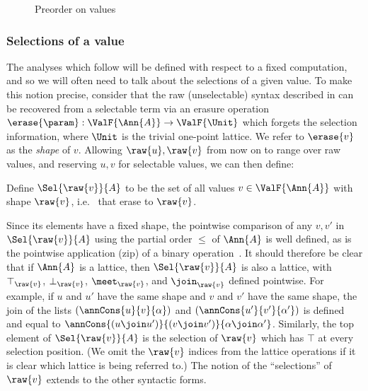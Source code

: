 \begin{figure}
   
   \caption{Preorder on values}
   \label{fig:data-dependencies:leq}
\end{figure}

\subsubsection{Selections of a value}
\label{sec:data-dependencies:selections}

The analyses which follow will be defined with respect to a fixed computation, and so we will often need to talk about the selections of a given value. To make this notion precise, consider that the raw (unselectable) syntax described in  can be recovered from a selectable term via an erasure operation $\erase{\param}: \ValF{\Ann{A}} \to \ValF{\Unit}$ which forgets the selection information, where $\Unit$ is the trivial one-point lattice. We refer to $\erase{v}$ as the \emph{shape} of $v$. Allowing $\raw{u}, \raw{v}$ from now on to range over raw values, and reserving $u, v$ for selectable values, we can then define:

\begin{definition}
   Define $\Sel{\raw{v}}{A}$ to be the set of all values $v \in \ValF{\Ann{A}}$ with shape $\raw{v}$, i.e.
   ~that erase to $\raw{v}$.
\end{definition}

Since its elements have a fixed shape, the pointwise comparison of any $v, v'$ in $\Sel{\raw{v}}{A}$ using the partial order $\leq$ of $\Ann{A}$ is well defined, as is the pointwise application (zip) of a binary operation~\cite{gibbons17}. It should therefore be clear that if $\Ann{A}$ is a lattice, then $\Sel{\raw{v}}{A}$ is also a lattice, with $\top_{\raw{v}}$, $\bot_{\raw{v}}$, $\meet_{\raw{v}}$, and $\join_{\raw{v}}$ defined pointwise. For example, if $u$ and $u'$ have the same shape and $v$ and $v'$ have the same shape, the join of the lists $(\annCons{u}{v}{\alpha})$ and $(\annCons{u'}{v'}{\alpha'})$ is defined and equal to $\annCons{(u \join u')}{(v \join v')}{\alpha \join \alpha'}$. Similarly, the top element of $\Sel{\raw{v}}{A}$ is the selection of $\raw{v}$ which has $\top$ at every selection position. (We omit the $\raw{v}$ indices from the lattice operations if it is clear which lattice is being referred to.) The notion of the ``selections'' of $\raw{v}$ extends to the other syntactic forms.

